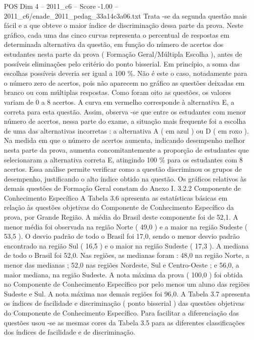 \begin{textsample}{POS Dim 4 – 2011\_c6 – Score -1.00 – 2011\_c6/enade\_2011\_pedag\_33a14c3a06.txt}
Trata -se da segunda questão mais fácil e a que obteve o maior índice de discriminação dessa parte da prova.
Neste gráfico, cada uma das cinco curvas representa o percentual de respostas em determinada alternativa da questão, em função do número de acertos dos estudantes nesta parte da prova ( Formação Geral/Múltipla Escolha ), antes de possíveis eliminações pelo critério do ponto bisserial.
Em princípio, a soma das escolhas possíveis deveria ser igual a 100 \%.
Não é este o caso, notadamente para o número zero de acertos, pois não aparecem no gráfico as questões deixadas em branco ou com múltiplas respostas.
Como foram oito as questões, os valores variam de 0 a 8 acertos.
A curva em vermelho corresponde à alternativa E, a correta para esta questão.
Assim, observa -se que entre os estudantes com menor número de acertos, nessa parte do exame, a situação mais frequente foi a escolha de uma das alternativas incorretas : a alternativa A ( em azul ) ou D ( em roxo ).
Na medida em que o número de acertos aumenta, indicando desempenho melhor nesta parte da prova, aumenta concomitantemente a proporção de estudantes que selecionaram a alternativa correta E, atingindo 100 \% para os estudantes com 8 acertos.
Essa análise permite verificar como a questão discriminou os grupos de desempenho, justificando o alto índice obtido na questão.
Os gráficos relativos às demais questões de Formação Geral constam do Anexo I. 3.2.2 Componente de Conhecimento Específico A Tabela 3.6 apresenta as estatísticas básicas em relação às questões objetivas do Componente de Conhecimento Específico da prova, por Grande Região.
A média do Brasil deste componente foi de 52,1.
A menor média foi observada na região Norte ( 49,0 ) e a maior na região Sudeste ( 53,5 ).
O desvio padrão de todo o Brasil foi 17,0, sendo o menor desvio padrão encontrado na região Sul ( 16,5 ) e o maior na região Sudeste ( 17,3 ).
A mediana de todo o Brasil foi 52,0.
Nas regiões, as medianas foram : 48,0 na região Norte, a menor das medianas ; 52,0 nas regiões Nordeste, Sul e Centro-Oeste ; e 56,0, a maior mediana, na região Sudeste.
A nota máxima da prova ( 100,0 ) foi obtida no Componente de Conhecimento Específico por pelo menos um aluno das regiões Sudeste e Sul.
A nota máxima nas demais regiões foi 96,0.
A Tabela 3.7 apresenta os índices de facilidade e discriminação ( ponto bisserial ) das questões objetivas do Componente de Conhecimento Específico.
Para facilitar a diferenciação das questões usou -se as mesmas cores da Tabela 3.5 para as diferentes classificações dos índices de facilidade e de discriminação.

\end{textsample}
